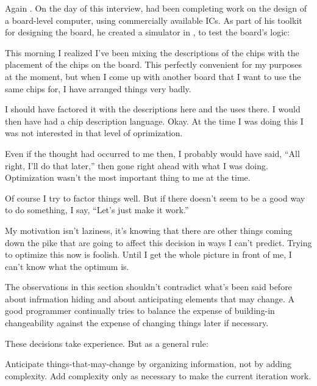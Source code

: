 \begin{interview}
Again . On the day of this interview,  had been completing work on the design of a board-level \Forth{} computer, using commercially available ICs. As part of his toolkit for designing the board, he created a simulator in \Forth{}, to test the board's logic:

\begin{tfquot}
This morning I realized I've been mixing the descriptions of the chips with the placement of the chips on the board. This perfectly convenient for my purposes at the moment, but when I come up with another board that I want to use the same chips for, I have arranged things very badly.

I should have factored it with the descriptions here and the uses there. I would then have had a chip description language. Okay. At the time I was doing this I was not interested in that level of oprimization.

Even if the thought had occurred to me then, I probably would have said, ``All right, I'll do that later,'' then gone right ahead with what I was doing. Optimization wasn't the most important thing to me at the time.

Of course I try to factor things well. But if there doesn't seem to be a good way to do something, I say, ``Let's just make it work.''

My motivation isn't laziness, it's knowing that there are other things coming down the pike that are going to affect this decision in ways I can't predict. Trying to optimize this now is foolish. Until I get the whole picture in front of me, I can't know what the optimum is.
\end{tfquot}
\end{interview}
The observations in this section shouldn't contradict what's been said before about infrmation hiding and about anticipating elements that may change. A good programmer continually tries to balance the expense of building-in changeability against the expense of changing things later if necessary.

These decisions take experience. But as a general rule:

\begin{tip}
Anticipate things-that-may-change by organizing information, not by
adding complexity. Add complexity only as necessary to make the
current iteration work.
\end{tip}

